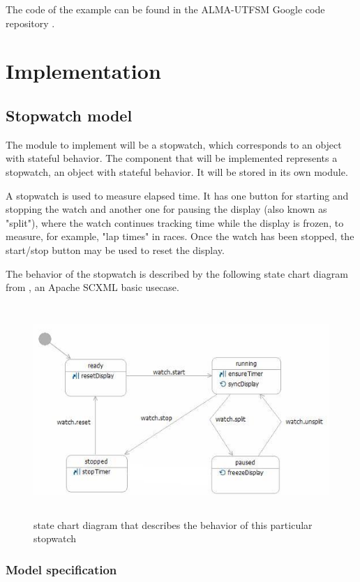 \documentclass[]{article}
\begin{document}
The code of the example can be found in the ALMA-UTFSM Google code repository \cite{GoogleCode}. 

\clearpage
\section{Implementation}

\subsection{Stopwatch model}

The module to implement will be a stopwatch, which corresponds to an object with stateful behavior.  The component that will be implemented represents a stopwatch, an object with stateful behavior. It will be stored in its own module.

A stopwatch is used to measure elapsed time. It has one button for starting and stopping the watch and another one for pausing the display (also known as "split"), where the watch continues tracking time while the display is frozen, to measure, for example, "lap times" in races. Once the watch has been stopped, the start/stop button may be used to reset the display.

The behavior of the stopwatch is described by the following state chart diagram from \cite{StopWatchApache}, an Apache SCXML basic usecase. 

\begin{figure}[!h]
	\centering
   \includegraphics[height=8cm]{img/stopwatch}
   \caption{state chart diagram that describes the behavior of this particular stopwatch}
\end{figure}

\subsubsection{Model specification}
\end{document}

